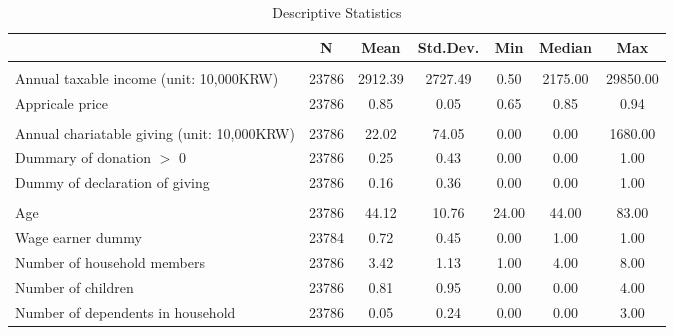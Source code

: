 \begin{table}

\caption{Descriptive Statistics\label{tab:summary-covariate}}
\centering
\fontsize{8}{10}\selectfont
\begin{threeparttable}
\begin{tabular}[t]{lcccccc}
\toprule
  & N & Mean & Std.Dev. & Min & Median & Max\\
\midrule
\addlinespace[0.3em]
\multicolumn{7}{l}{\textit{Income and giving price}}\\
\hspace{1em}Annual taxable income (unit: 10,000KRW) & 23786 & \num{2912.39} & \num{2727.49} & \num{0.50} & \num{2175.00} & \num{29850.00}\\
\hspace{1em}Appricale price & 23786 & \num{0.85} & \num{0.05} & \num{0.65} & \num{0.85} & \num{0.94}\\
\addlinespace[0.3em]
\multicolumn{7}{l}{\textit{Charitable giving}}\\
\hspace{1em}Annual chariatable giving (unit: 10,000KRW) & 23786 & \num{22.02} & \num{74.05} & \num{0.00} & \num{0.00} & \num{1680.00}\\
\hspace{1em}Dummary of donation $>$ 0 & 23786 & \num{0.25} & \num{0.43} & \num{0.00} & \num{0.00} & \num{1.00}\\
\hspace{1em}Dummy of declaration of giving & 23786 & \num{0.16} & \num{0.36} & \num{0.00} & \num{0.00} & \num{1.00}\\
\addlinespace[0.3em]
\multicolumn{7}{l}{\textit{Demographics}}\\
\hspace{1em}Age & 23786 & \num{44.12} & \num{10.76} & \num{24.00} & \num{44.00} & \num{83.00}\\
\hspace{1em}Wage earner dummy & 23784 & \num{0.72} & \num{0.45} & \num{0.00} & \num{1.00} & \num{1.00}\\
\hspace{1em}Number of household members & 23786 & \num{3.42} & \num{1.13} & \num{1.00} & \num{4.00} & \num{8.00}\\
\hspace{1em}Number of children & 23786 & \num{0.81} & \num{0.95} & \num{0.00} & \num{0.00} & \num{4.00}\\
\hspace{1em}Number of dependents in household & 23786 & \num{0.05} & \num{0.24} & \num{0.00} & \num{0.00} & \num{3.00}\\

\end{tabular}
\end{threeparttable}
\end{table}
